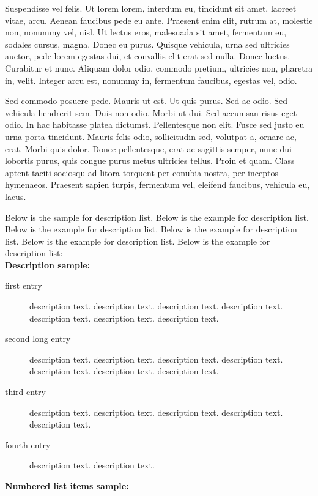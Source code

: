 \documentclass[AMA]{WileyNJD-v1}
\begin{document}
Suspendisse vel felis. Ut lorem lorem, interdum eu, tincidunt sit amet, laoreet vitae, arcu. Aenean faucibus pede eu
ante. Praesent enim elit, rutrum at, molestie non, nonummy vel, nisl. Ut lectus eros, malesuada sit amet, fermentum
eu, sodales cursus, magna. Donec eu purus. Quisque vehicula, urna sed ultricies auctor, pede lorem egestas dui, et
convallis elit erat sed nulla. Donec luctus. Curabitur et nunc. Aliquam dolor odio, commodo pretium, ultricies non,
pharetra in, velit. Integer arcu est, nonummy in, fermentum faucibus, egestas vel, odio.

Sed commodo posuere pede. Mauris ut est. Ut quis purus. Sed ac odio. Sed vehicula hendrerit sem. Duis non
odio. Morbi ut dui. Sed accumsan risus eget odio. In hac habitasse platea dictumst. Pellentesque non elit. Fusce
sed justo eu urna porta tincidunt. Mauris felis odio, sollicitudin sed, volutpat a, ornare ac, erat. Morbi quis dolor. Donec pellentesque, erat ac sagittis semper, nunc dui lobortis purus, quis congue purus metus ultricies tellus. Proin
et quam. Class aptent taciti sociosqu ad litora torquent per conubia nostra, per inceptos hymenaeos. Praesent sapien
turpis, fermentum vel, eleifend faucibus, vehicula eu, lacus.


Below is the sample for description list. Below is the example for description list. Below is the example for description list. Below is the example for description list. Below is the example for description list. Below is the example for description list:\\[12pt]


\noindent\textbf{Description sample:}

\begin{description}
\item[first entry] description text. description text.\cites{Kucharik_Shashkov-MM_remap-FVCA-Proc-11,Kucharik_Shashkov-MM_remap-13,Loubere-Shashkov-subcell-remap-JCP-05} description text. description text. description text. description text. description text. 
\item[second long entry] description text. description text. description text. description text. description text. description text. description text. 
\item[third entry] description text. description text. description text. description text. description text. 
\item[fourth entry] description text. description text. 
\end{description}


\noindent\textbf{Numbered list items sample:}
\end{document}
